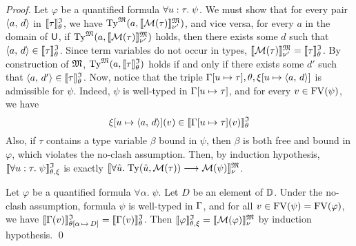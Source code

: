 \begin{proof}
Let $\varphi$ be a quantified formula $\forall u \mathrel{:} \tau .\; \psi$.
We must show that for every pair $\langle a,\, d \rangle$ in $\llbracket\tau\rrbracket^{\mathfrak{I}}_{\theta}$, we have
$\mathrm{Ty}^{\mathfrak{M}}(a, \llbracket \mathcal{M}(\tau) \rrbracket^{\mathfrak{M}}_{\nu'})$,
and vice versa, for every $a$ in the domain of $\mathsf{U}$, if
$\mathrm{Ty}^{\mathfrak{M}}(a, \llbracket \mathcal{M}(\tau) \rrbracket^{\mathfrak{M}}_{\nu'})$
holds, then there exists some $d$ such that $\langle a,\, d \rangle \in
\llbracket\tau\rrbracket^{\mathfrak{I}}_{\theta}$.
%
Since term variables do not occur in types,
$\llbracket \mathcal{M}(\tau) \rrbracket^{\mathfrak{M}}_{\nu'} =
\llbracket \tau \rrbracket^{\mathfrak{I}}_\theta$.
By construction of $\mathfrak{M}$,
$\mathrm{Ty}^{\mathfrak{M}}(a, \llbracket \tau \rrbracket^{\mathfrak{I}}_\theta)$
holds if and only if there exists some $d'$ such that
$\langle a,\, d' \rangle \in \llbracket \tau \rrbracket^{\mathfrak{I}}_\theta$.
%
Now, notice that the triple $\mathrm{\Gamma}[u \mapsto \tau],
\theta,\xi[u \mapsto \langle a,\, d \rangle]$ is admissible for $\psi$.
Indeed, $\psi$ is well-typed in $\mathrm{\Gamma}[u \mapsto \tau]$,
and for every $v \in \mathrm{FV}(\psi)$, we have
\[\xi[u \mapsto \langle a,\, d \rangle](v) \in \llbracket\mathrm{\Gamma}[u \mapsto \tau](v)\rrbracket^{\mathfrak{I}}_{\theta}\]%
Also, if $\tau$ contains a type variable $\beta$ bound in $\psi$,
then $\beta$ is both free and bound in $\varphi$, which violates
the no-clash assumption.
%
Then, by induction hypothesis, $\llbracket\forall u \mathrel{:} \tau .\; \psi\rrbracket^{\mathfrak{I}}_{\theta,\xi}$
is exactly $\llbracket \forall \hat{u} .\; \mathrm{Ty}(\hat{u},\mathcal{M}(\tau))
\longrightarrow \mathcal{M}(\psi) \rrbracket^{\mathfrak{M}}_{\nu}$.

Let $\varphi$ be a quantified formula $\forall \alpha .\; \psi$.
Let $D$ be an element of $\mathbb{D}$. Under the no-clash assumption,
formula $\psi$ is well-typed in $\mathrm{\Gamma}$, and for all
$v \in \mathrm{FV}(\psi) = \mathrm{FV}(\varphi)$, we have
$\llbracket\mathrm{\Gamma}(v)\rrbracket^{\mathfrak{I}}_{\theta[\alpha\,\mapsto\,D]} = \llbracket\mathrm{\Gamma}(v)\rrbracket^{\mathfrak{I}}_{\theta}$.
Then $\llbracket\varphi\rrbracket^{\mathfrak{I}}_{\theta,\xi} = \llbracket \mathcal{M}(\varphi) \rrbracket^{\mathfrak{M}}_{\nu}$ by induction hypothesis.
\qed
\end{proof}
